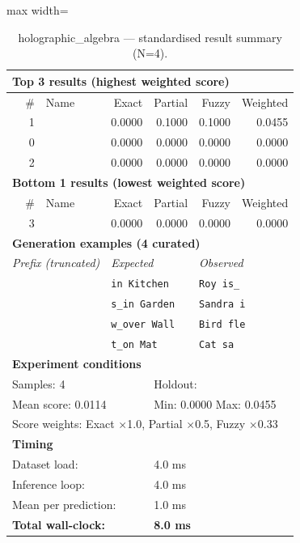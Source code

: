 \begin{table}[htbp]
\centering
\caption{holographic\_algebra — standardised result summary (N=4).}
\label{tab:holographic_algebra_summary}
\begin{adjustbox}{max width=\textwidth}
\begin{tabular}{r p{5cm} r r r r}
\toprule
\multicolumn{6}{l}{\textbf{Top 3 results (highest weighted score)}} \\
\midrule
\# & Name & Exact & Partial & Fuzzy & Weighted \\
\midrule
1 &  & 0.0000 & 0.1000 & 0.1000 & 0.0455 \\
0 &  & 0.0000 & 0.0000 & 0.0000 & 0.0000 \\
2 &  & 0.0000 & 0.0000 & 0.0000 & 0.0000 \\
\midrule
\multicolumn{6}{l}{\textbf{Bottom 1 results (lowest weighted score)}} \\
\midrule
\# & Name & Exact & Partial & Fuzzy & Weighted \\
\midrule
3 &  & 0.0000 & 0.0000 & 0.0000 & 0.0000 \\
\midrule
\multicolumn{6}{l}{\textbf{Generation examples (4 curated)}} \\
\midrule
\multicolumn{2}{l}{\textit{Prefix (truncated)}} & \multicolumn{2}{l}{\textit{Expected}} & \multicolumn{2}{l}{\textit{Observed}} \\
\midrule
\multicolumn{2}{l}{\texttt{}} & \multicolumn{2}{l}{\texttt{in Kitchen}} & \multicolumn{2}{l}{\texttt{Roy is\_}} \\
\multicolumn{2}{l}{\texttt{}} & \multicolumn{2}{l}{\texttt{s\_in Garden}} & \multicolumn{2}{l}{\texttt{Sandra i}} \\
\multicolumn{2}{l}{\texttt{}} & \multicolumn{2}{l}{\texttt{w\_over Wall}} & \multicolumn{2}{l}{\texttt{Bird fle}} \\
\multicolumn{2}{l}{\texttt{}} & \multicolumn{2}{l}{\texttt{t\_on Mat}} & \multicolumn{2}{l}{\texttt{Cat sa}} \\
\midrule
\multicolumn{6}{l}{\textbf{Experiment conditions}} \\
\midrule
\multicolumn{3}{l}{Samples: 4} & \multicolumn{3}{l}{Holdout: } \\
\multicolumn{3}{l}{Mean score: 0.0114} & \multicolumn{3}{l}{Min: 0.0000 \quad Max: 0.0455} \\
\multicolumn{6}{l}{Score weights: Exact $\times$1.0, Partial $\times$0.5, Fuzzy $\times$0.33} \\
\midrule
\multicolumn{6}{l}{\textbf{Timing}} \\
\midrule
\multicolumn{3}{l}{Dataset load:} & \multicolumn{3}{l}{4.0 ms} \\
\multicolumn{3}{l}{Inference loop:} & \multicolumn{3}{l}{4.0 ms} \\
\multicolumn{3}{l}{Mean per prediction:} & \multicolumn{3}{l}{1.0 ms} \\
\multicolumn{3}{l}{\textbf{Total wall-clock:}} & \multicolumn{3}{l}{\textbf{8.0 ms}} \\
\bottomrule
\end{tabular}
\end{adjustbox}
\end{table}
